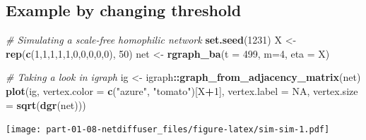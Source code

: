 \documentclass[]{book}
\newenvironment{Shaded}{\begin{snugshade}}{\end{snugshade}}
\newcommand{\CommentTok}[1]{\textcolor[rgb]{0.56,0.35,0.01}{\textit{#1}}}
\newcommand{\DataTypeTok}[1]{\textcolor[rgb]{0.13,0.29,0.53}{#1}}
\newcommand{\DecValTok}[1]{\textcolor[rgb]{0.00,0.00,0.81}{#1}}
\newcommand{\KeywordTok}[1]{\textcolor[rgb]{0.13,0.29,0.53}{\textbf{#1}}}
\newcommand{\NormalTok}[1]{#1}
\newcommand{\OperatorTok}[1]{\textcolor[rgb]{0.81,0.36,0.00}{\textbf{#1}}}
\newcommand{\OtherTok}[1]{\textcolor[rgb]{0.56,0.35,0.01}{#1}}
\newcommand{\StringTok}[1]{\textcolor[rgb]{0.31,0.60,0.02}{#1}}
\begin{document}
\hypertarget{example-by-changing-threshold}{%
\subsection{Example by changing threshold}\label{example-by-changing-threshold}}

\begin{Shaded}
\begin{Highlighting}[]

\CommentTok{# Simulating a scale-free homophilic network}
\KeywordTok{set.seed}\NormalTok{(}\DecValTok{1231}\NormalTok{)}
\NormalTok{X <-}\StringTok{ }\KeywordTok{rep}\NormalTok{(}\KeywordTok{c}\NormalTok{(}\DecValTok{1}\NormalTok{,}\DecValTok{1}\NormalTok{,}\DecValTok{1}\NormalTok{,}\DecValTok{1}\NormalTok{,}\DecValTok{1}\NormalTok{,}\DecValTok{0}\NormalTok{,}\DecValTok{0}\NormalTok{,}\DecValTok{0}\NormalTok{,}\DecValTok{0}\NormalTok{,}\DecValTok{0}\NormalTok{), }\DecValTok{50}\NormalTok{)}
\NormalTok{net <-}\StringTok{ }\KeywordTok{rgraph_ba}\NormalTok{(}\DataTypeTok{t =} \DecValTok{499}\NormalTok{, }\DataTypeTok{m=}\DecValTok{4}\NormalTok{, }\DataTypeTok{eta =}\NormalTok{ X)}

\CommentTok{# Taking a look in igraph}
\NormalTok{ig  <-}\StringTok{ }\NormalTok{igraph}\OperatorTok{::}\KeywordTok{graph_from_adjacency_matrix}\NormalTok{(net)}
\KeywordTok{plot}\NormalTok{(ig, }\DataTypeTok{vertex.color =} \KeywordTok{c}\NormalTok{(}\StringTok{"azure"}\NormalTok{, }\StringTok{"tomato"}\NormalTok{)[X}\OperatorTok{+}\DecValTok{1}\NormalTok{], }\DataTypeTok{vertex.label =} \OtherTok{NA}\NormalTok{,}
     \DataTypeTok{vertex.size =} \KeywordTok{sqrt}\NormalTok{(}\KeywordTok{dgr}\NormalTok{(net)))}
\end{Highlighting}
\end{Shaded}

\texttt{[image: part-01-08-netdiffuser\_files/figure-latex/sim-sim-1.pdf]}
\end{document}
